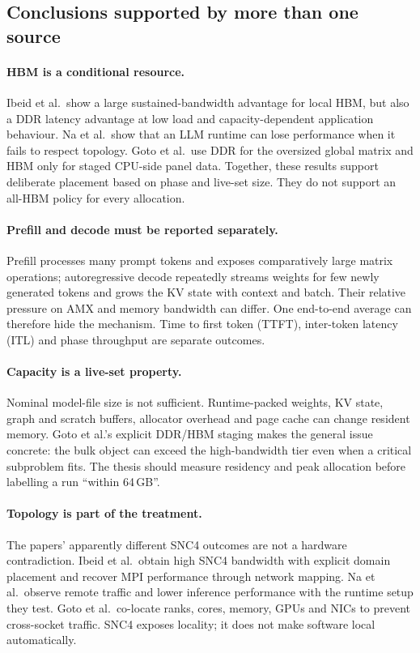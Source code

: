 \subsection{Conclusions supported by more than one source}

\paragraph{HBM is a conditional resource.}
Ibeid et al.\ show a large sustained-bandwidth advantage for local HBM,
but also a DDR latency advantage at low load and capacity-dependent
application behaviour.  Na et al.\ show that an LLM runtime can lose
performance when it fails to respect topology.  Goto et al.\ use DDR
for the oversized global matrix and HBM only for staged CPU-side panel
data.  Together, these results support deliberate placement based on
phase and live-set size.  They do not support an all-HBM policy for
every allocation.

\paragraph{Prefill and decode must be reported separately.}
Prefill processes many prompt tokens and exposes comparatively large
matrix operations; autoregressive decode repeatedly streams weights for
few newly generated tokens and grows the KV state with context and
batch.  Their relative pressure on AMX and memory bandwidth can differ.
One end-to-end average can therefore hide the mechanism.  Time to first
token (TTFT), inter-token latency (ITL) and phase throughput are separate
outcomes.

\paragraph{Capacity is a live-set property.}
Nominal model-file size is not sufficient.  Runtime-packed weights, KV
state, graph and scratch buffers, allocator overhead and page cache can
change resident memory.  Goto et al.'s explicit DDR/HBM staging makes
the general issue concrete: the bulk object can exceed the high-bandwidth
tier even when a critical subproblem fits.  The thesis should measure
residency and peak allocation before labelling a run ``within 64\,GB''.

\paragraph{Topology is part of the treatment.}
The papers' apparently different SNC4 outcomes are not a hardware
contradiction.  Ibeid et al.\ obtain high SNC4 bandwidth with explicit
domain placement and recover MPI performance through network mapping.
Na et al.\ observe remote traffic and lower inference performance with
the runtime setup they test.  Goto et al.\ co-locate ranks, cores,
memory, GPUs and NICs to prevent cross-socket traffic.  SNC4 exposes
locality; it does not make software local automatically.

